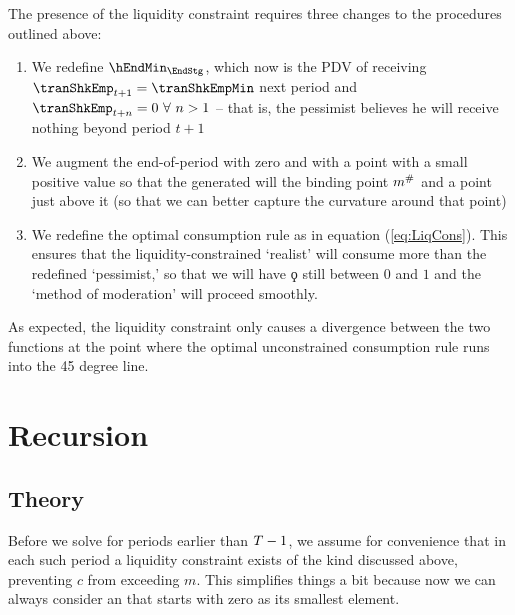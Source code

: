 \documentclass[SolvingMicroDSOPs]{subfiles}
\begin{document}
The presence of the liquidity
constraint requires three changes to the procedures outlined above:
\begin{enumerate}
\item We redefine
  $\hEndMin_{\EndStg}$, which now is the PDV of receiving
  $\tranShkEmp_{\prd+1}=\tranShkEmpMin$ next period and
  $\tranShkEmp_{t+n}=0~\forall~n>1$ -- that is, the pessimist believes he
  will receive nothing beyond period $t+1$
\item We augment the end-of-period  with zero and with a point with a small positive value so that the generated
  {\mVec} will the binding point $m^{\#}$ and a point just above it (so that we can better capture the curvature
  around that point)
\item We redefine the optimal consumption rule as
  in equation (\ref{eq:LiqCons}).  This ensures that the
  liquidity-constrained `realist' will consume more than the redefined
  `pessimist,' so that we will have $\koppa$ still between $0$ and $1$
  and the `method of moderation' will proceed smoothly.
\end{enumerate}

As expected, the liquidity constraint only causes a divergence between the two functions at the point where the optimal unconstrained consumption rule runs into the 45 degree line.

\hypertarget{recursion}{}
\section{Recursion}\label{sec:recursion}

\hypertarget{theory}{}
\subsection{Theory}
Before we solve for periods earlier than $T-1$, we assume for
convenience that in each such period a liquidity constraint exists of
the kind discussed above, preventing $c$ from exceeding $m$. This
simplifies things a bit because now we can always consider an
 that starts with zero as its smallest element.
\end{document}
